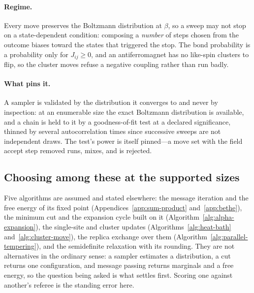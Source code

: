 \documentclass[11pt,a4paper]{article}
\begin{document}
\paragraph{Regime.}
Every move preserves the Boltzmann distribution at $\beta$, so a sweep may not
stop on a state-dependent condition: composing a \emph{number} of steps chosen
from the outcome biases toward the states that triggered the stop. The bond
probability is a probability only for $J_{ij} \ge 0$, and an antiferromagnet
has no like-spin clusters to flip, so the cluster moves refuse a negative
coupling rather than run badly.

\paragraph{What pins it.}
A sampler is validated by the distribution it converges to and never by
inspection: at an enumerable size the exact Boltzmann distribution is
available, and a chain is held to it by a goodness-of-fit test at a declared
significance, thinned by several autocorrelation times since successive sweeps
are not independent draws. The test's power is itself pinned---a move set with
the field accept step removed runs, mixes, and is rejected.

\subsection{Choosing among these at the supported sizes}
\label{sec:potts:discussion}
Five algorithms are assumed and stated elsewhere: the message iteration and
the free energy of its fixed point (Appendices~\ref{app:sum-product}
and~\ref{app:bethe}), the minimum cut and the expansion cycle built on it
(Algorithm~\ref{alg:alpha-expansion}), the single-site and cluster updates
(Algorithms~\ref{alg:heat-bath} and~\ref{alg:cluster-move}), the replica
exchange over them (Algorithm~\ref{alg:parallel-tempering}), and the
semidefinite relaxation with its rounding. They are not alternatives in the
ordinary sense: a sampler estimates a distribution, a cut returns one
configuration, and message passing returns marginals and a free energy, so the
question being asked is what settles first. Scoring one against another's
referee is the standing error here.
\end{document}
